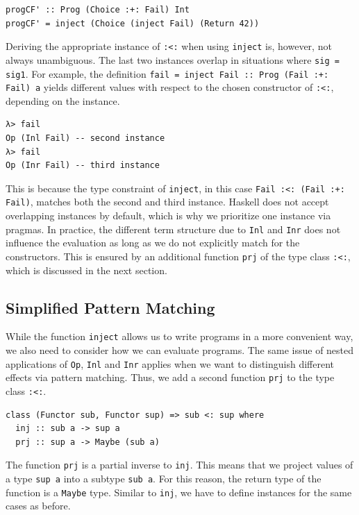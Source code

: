 \documentclass[a4paper, 11pt, fleqn, twoside]{scrreprt}
\newcommand{\hinl}[1]{\texttt{#1}}
\begin{document}
\begin{verbatim}
progCF' :: Prog (Choice :+: Fail) Int
progCF' = inject (Choice (inject Fail) (Return 42))
\end{verbatim}

Deriving the appropriate instance of \hinl{:<:} when using \hinl{inject} is, however, not always unambiguous.
The last two instances overlap in situations where \hinl{sig = sig1}.
For example, the definition \hinl{fail = inject Fail :: Prog (Fail :+: Fail) a} yields different values with respect to the chosen constructor of \hinl{:<:}, depending on the instance.

\begin{verbatim}
λ> fail
Op (Inl Fail) -- second instance
λ> fail
Op (Inr Fail) -- third instance
\end{verbatim}

This is because the type constraint of \hinl{inject}, in this case \hinl{Fail :<: (Fail :+: Fail)}, matches both the second and third instance.
Haskell does not accept overlapping instances by default, which is why we prioritize one instance via pragmas.
In practice, the different term structure due to \hinl{Inl} and \hinl{Inr} does not influence the evaluation as long as we do not explicitly match for the constructors.
This is ensured by an additional function \hinl{prj} of the type class \hinl{:<:}, which is discussed in the next section.

\subsection{Simplified Pattern Matching}
While the function \hinl{inject} allows us to write programs in a more convenient way, we also need to consider how we can evaluate programs.
The same issue of nested applications of \hinl{Op}, \hinl{Inl} and \hinl{Inr} applies when we want to distinguish different effects via pattern matching.
Thus, we add a second function \hinl{prj} to the type class \hinl{:<:}.

\begin{verbatim}
class (Functor sub, Functor sup) => sub <: sup where
  inj :: sub a -> sup a
  prj :: sup a -> Maybe (sub a)
\end{verbatim}

The function \hinl{prj} is a partial inverse to \hinl{inj}.
This means that we project values of a type \hinl{sup a} into a subtype \hinl{sub a}.
For this reason, the return type of the function is a \hinl{Maybe} type.
Similar to \hinl{inj}, we have to define instances for the same cases as before.
\end{document}
